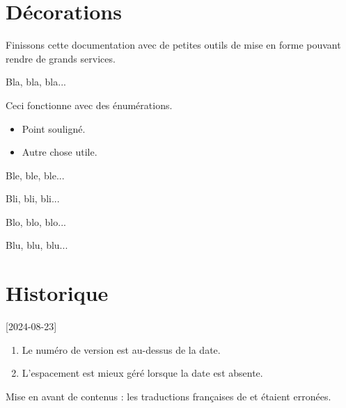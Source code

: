 \section{Décorations}

Finissons cette documentation avec de petites outils de mise en forme pouvant rendre de grands services.


\begin{tdoclatex}[sbs]
Bla, bla, bla...

\tdocsep %

Ceci fonctionne avec des énumérations.

\begin{itemize}
    \item Point souligné.

    \item Autre chose utile.
\end{itemize}

\tdocsep %

Ble, ble, ble...

Bli, bli, bli...

\tdocxspace %

Blo, blo, blo...

Blu, blu, blu...

\end{tdoclatex}


\section{Historique}

[2024-08-23]

\begin{tdocupdate}
    \item {}
    \begin{enumerate}
        \item Le numéro de version est au-dessus de la date.

        \item L'espacement est mieux géré lorsque la date est absente.
    \end{enumerate}
\end{tdocupdate}


\begin{tdocfix}
    \item Mise en avant de contenus : les traductions françaises de  et  étaient erronées.
\end{tdocfix}

